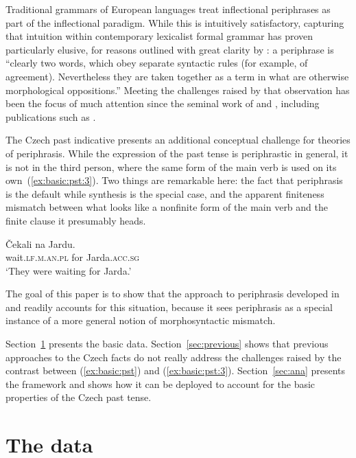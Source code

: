 \documentclass[output=paper]{langsci/langscibook}
\begin{document}
Traditional grammars of European languages treat inflectional periphrases as part of the inflectional paradigm. While this is intuitively satisfactory, capturing that intuition within contemporary lexicalist formal grammar has proven particularly elusive, for reasons outlined with great clarity by \citet[219--220]{Matthews91}: a periphrase is ``clearly two words, which obey separate syntactic rules (for example, of agreement). Nevertheless they are taken together as a term in what are otherwise morphological oppositions.'' Meeting the challenges raised by that observation has been the focus of much attention since the seminal work of \citet{Vincent96} and \citet{Ackerman98}, including publications such as \citet{Sadler01,Ackerman04,Stump11,Brown12c,Bonami13,Popova13,Stump13,Dalrymple15,Bonami14d}.


The Czech past indicative presents an additional conceptual challenge for theories of periphrasis. While the expression of the past tense is periphrastic in general, it is not in the third person, where the same form of the main verb is used on its own~(\ref{ex:basic:pst:3}). Two things are remarkable here: the fact that periphrasis is the default while synthesis is the special case, and the apparent finiteness mismatch between what looks like a nonfinite form of the main verb and the finite clause it presumably heads.

\begin{exe}
\ex\label{ex:basic:pst:3}\gll Čekali  na Jardu.\\ 
wait.\textsc{lf.m.an.pl}  for Jarda.\textsc{acc.sg}\\
\glt ‘They were waiting for Jarda.’
\end{exe}

The goal of this paper is to show that the approach to periphrasis developed in \citet{Bonami14d} and \citet{Bonami16b} readily accounts for this situation, because it sees periphrasis as a special instance of a more general notion of morphosyntactic mismatch.

Section~\ref{sec:data} presents the basic data. Section~\ref{sec:previous} shows that previous approaches to the Czech facts do not really address the challenges raised by the contrast between (\ref{ex:basic:pst}) and (\ref{ex:basic:pst:3}). Section~\ref{sec:ana} presents the framework and shows how it can be deployed to account for the basic properties of the Czech past tense.



\section{The  data}
\label{sec:data}
\end{document}
